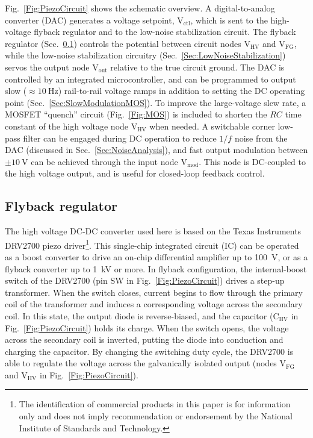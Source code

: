 \documentclass[aip,rsi,reprint]{revtex4-1} %
\begin{document}
Fig.~\ref{Fig:PiezoCircuit} shows the schematic overview. 
A digital-to-analog converter (DAC) generates a voltage setpoint, $\text{V}_\text{ctl}$, which is sent to the high-voltage flyback regulator and to the low-noise stabilization circuit.
The flyback regulator (Sec.~\ref{Sec:DRV2700}) controls the potential between circuit nodes $\text{V}_\text{HV}$ and $\text{V}_\text{FG}$, while the low-noise stabilization circuitry (Sec.~\ref{Sec:LowNoiseStabilization}) servos the output node $\text{V}_\text{out}$ relative to the true circuit ground.
The DAC is controlled by an integrated microcontroller, and can be programmed to output slow ($\approx\SI{10}{\hertz}$) rail-to-rail voltage ramps in addition to setting the DC operating point (Sec.~\ref{Sec:SlowModulationMOS}).
To improve the large-voltage slew rate, a MOSFET ``quench'' circuit (Fig.~\ref{Fig:MOS}) is included to shorten the $RC$ time constant of the high voltage node $\text{V}_\text{HV}$ when needed.
A switchable corner low-pass filter can be engaged during DC operation to reduce $1/f$ noise from the DAC (discussed in Sec.~\ref{Sec:NoiseAnalysis}), and
fast output modulation between $\pm\SI{10}{\volt}$ can be achieved through the input node $\text{V}_\text{mod}$.
This node is DC-coupled to the high voltage output, and is useful for closed-loop feedback control.




\subsection{Flyback regulator}
\label{Sec:DRV2700}

The high voltage DC-DC converter used here is based on the Texas Instruments DRV2700 piezo driver\footnote{The identification of commercial products in this paper is for information only and does not imply recommendation or endorsement by the National Institute of Standards and Technology.}.
This single-chip integrated circuit (IC) can be operated as a boost converter to drive an on-chip differential amplifier up to \SI{100}{\volt}, or as a flyback converter up to \SI{1}{\kilo\volt} or more.
In flyback configuration, the internal-boost switch of the DRV2700 (pin SW in Fig.~\ref{Fig:PiezoCircuit}) drives a step-up transformer.
When the switch closes, current begins to flow through the primary coil of the transformer and induces a corresponding voltage across the secondary coil.
In this state, the output diode is reverse-biased, and the capacitor ($\text{C}_{\text{HV}}$ in Fig.~\ref{Fig:PiezoCircuit}) holds its charge.
When the switch opens, the voltage across the secondary coil is inverted, putting the diode into conduction and charging the capacitor.
By changing the switching duty cycle, the DRV2700 is able to regulate the voltage across the galvanically isolated output (nodes $\text{V}_\text{FG}$ and $\text{V}_\text{HV}$ in Fig.~\ref{Fig:PiezoCircuit}).
\end{document}
